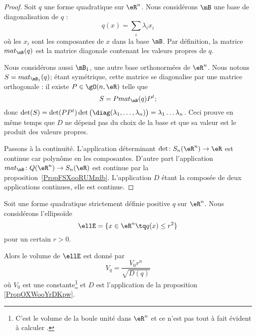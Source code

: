 \begin{proof}
	Soit \( q\) une forme quadratique sur \( \eR^n\). Nous considérons \( \mB\) une base de diagonalisation de \( q\) :
	\begin{equation}
		q(x)=\sum_i\lambda_ix_i
	\end{equation}
	où les \( x_i\) sont les composantes de \( x\) dans la base \( \mB\). Par définition, la matrice \( mat_{\mB}(q)\) est la matrice diagonale contenant les valeurs propres de \( q\).

	Nous considérons aussi \( \mB_1\), une autre base orthonormées de \( \eR^n\). Nous notons \( S=mat_{\mB_1}(q)\); étant symétrique, cette matrice se diagonalise par une matrice orthogonale : il existe \( P\in\gO(n,\eR)\) telle que
	\begin{equation}
		S=P mat_{\mB}(q)P^t;
	\end{equation}
	donc \( \det(S)=\det(PP^t)\det\big( \diag(\lambda_1,\ldots, \lambda_n) \big)=\lambda_1\ldots\lambda_n\). Ceci prouve en même temps que \( D\) ne dépend pas du choix de la base et que sa valeur est le produit des valeurs propres.

	Passons à la continuité. L'application déterminant \( \det\colon S_n(\eR^n)\to \eR\) est continue car polynôme en les composantes. D'autre part l'application \( mat_{\mB}\colon Q(\eR^n)\to S_n(\eR)\) est continue par la proposition~\ref{PropFSXooRUMzdb}. L'application  \( D\) étant la composée de deux applications continues, elle est continue.
\end{proof}

\begin{lemma}       \label{LEMooLSTOooZiEOdx}
	Soit une forme quadratique strictement définie positive \( q\) sur \( \eR^n\). Nous considérons l'ellipsoïde
	\begin{equation}
		\ellE=\{ x\in \eR^n\tq q(x)\leq r^2 \}
	\end{equation}
	pour un certain \( r>0\).

	Alors le volume de \( \ellE\) est donné par
	\begin{equation}
		V_q=\frac{ V_0 r^n }{ \sqrt{ D(q) } }
	\end{equation}
	où \( V_0\) est une constante\footnote{C'est le volume de la boule unité dans \( \eR^n\) et ce n'est pas tout à fait évident à calculer \cite{ooVLVAooXWmUVB}.} et \( D\) est l'application de la proposition \ref{PropOXWooYrDKpw}.
\end{lemma}


